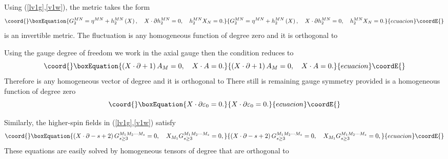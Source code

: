 \documentclass[a4paper,12pt]{article}
\begin{document}
Using (\ref{lv1g},\ref{v1w}), the metric \coordHE{} takes
the form
\begin{equation}\coord{}\boxEquation{
G_{2}^{MN}=\eta ^{MN}+h_{2}^{MN}\left( X\right) ,\quad X\cdot \partial
h_{2}^{MN}=0,\quad h_{2}^{MN}X_{N}=0.
}{
G_{2}^{MN}=\eta ^{MN}+h_{2}^{MN}\left( X\right) ,\quad X\cdot \partial
h_{2}^{MN}=0,\quad h_{2}^{MN}X_{N}=0.
}{ecuacion}\coordE{}\end{equation}
\coordHE{} is an invertible metric. The fluctuation \coordHE{} is any homogeneous function of degree zero and it is orthogonal
to \coordHE{}

Using the \coordHE{} gauge degree of freedom we work
in the axial gauge \coordHE{} then the condition \coordHE{} reduces
to
\begin{equation}\coord{}\boxEquation{
\left( X\cdot \partial +1\right) A_{M}=0,\quad X\cdot A=0.
}{
\left( X\cdot \partial +1\right) A_{M}=0,\quad X\cdot A=0.
}{ecuacion}\coordE{}\end{equation}
Therefore \coordHE{} is any homogeneous vector of degree \myHighlight{$%
\left( -1\right) $}\coordHE{} and it is orthogonal to \coordHE{} There still is remaining
gauge symmetry \coordHE{} provided \coordHE{} is a homogeneous function of degree zero
\begin{equation}\coord{}\boxEquation{
X\cdot \partial \varepsilon _{0}=0.
}{
X\cdot \partial \varepsilon _{0}=0.
}{ecuacion}\coordE{}\end{equation}

Similarly, the higher-spin fields in (\ref{lv1g},\ref{v1w}) satisfy
\begin{equation}\coord{}\boxEquation{
\left( X\cdot \partial -s+2\right) G_{s\geq 3}^{M_{1}M_{2}\cdots
M_{s}}=0,\quad X_{M_{1}}G_{s\geq 3}^{M_{1}M_{2}\cdots M_{s}}=0,
}{
\left( X\cdot \partial -s+2\right) G_{s\geq 3}^{M_{1}M_{2}\cdots
M_{s}}=0,\quad X_{M_{1}}G_{s\geq 3}^{M_{1}M_{2}\cdots M_{s}}=0,
}{ecuacion}\coordE{}\end{equation}
These equations are easily solved by homogeneous tensors of degree \coordHE{}
that are orthogonal to \coordHE{}
\end{document}
